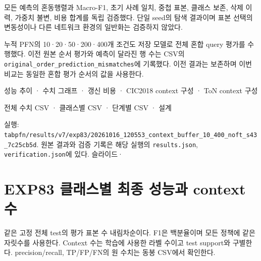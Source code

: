 모든 예측의 혼동행렬과 Macro-F1, 초기 사례 일치, 중첩 표본, 클래스 보존, 삭제 이력, 가중치 불변, 비용 합계를 독립 검증했다. 단일 seed의 탐색 결과이며 표본 선택의 변동성이나 다른 네트워크 환경의 일반화는 검증하지 않았다.

누적 PFN의 10·20·50·200·400개 조건도 저장 모델로 전체 혼합 query 평가를 수행했다. 이전 원본 순서 평가와 예측이 달라진 행 수는 CSV의 \texttt{original\allowbreak{}\_\allowbreak{}\allowbreak{}order\_\allowbreak{}\allowbreak{}p\allowbreak{}redictio\allowbreak{}n\_\allowbreak{}\allowbreak{}mismat\allowbreak{}ches}에 기록했다. 이전 결과는 보존하며 이번 비교는 동일한 혼합 평가 순서의 값을 사용한다.

성능 추이 · 수치 그래프 · 갱신 비용 · CIC2018 context 구성 · ToN context 구성

전체 수치 CSV · 클래스별 CSV · 단계별 CSV · 설계

실행: \texttt{tabpfn/\allowbreak{}\allowbreak{}r\allowbreak{}esults/\allowbreak{}\allowbreak{}v\allowbreak{}7/\allowbreak{}\allowbreak{}exp83/\allowbreak{}\allowbreak{}20261016\allowbreak{}\_\allowbreak{}\allowbreak{}120553\_\allowbreak{}\allowbreak{}context\_\allowbreak{}\allowbreak{}buffer\_\allowbreak{}\allowbreak{}1\allowbreak{}0\_\allowbreak{}\allowbreak{}400\_\allowbreak{}\allowbreak{}no\allowbreak{}ft\_\allowbreak{}\allowbreak{}s43\_\allowbreak{}\allowbreak{}7\allowbreak{}c25cb5d}. 원본 결과와 검증 기록은 해당 실행의 \texttt{results.\allowbreak{}json}, \texttt{verifica\allowbreak{}tion.\allowbreak{}jso\allowbreak{}n}에 있다. 슬라이드·



\section{EXP83 클래스별 최종 성능과 context 수}
같은 고정 전체 test의 평가 표본 수 내림차순이다. F1은 백분율이며 모든 정책에 같은 자릿수를 사용한다. Context 수는 학습에 사용한 라벨 수이고 test support와 구별한다. precision/recall, TP/FP/FN의 원 수치는 동봉 CSV에서 확인한다.
